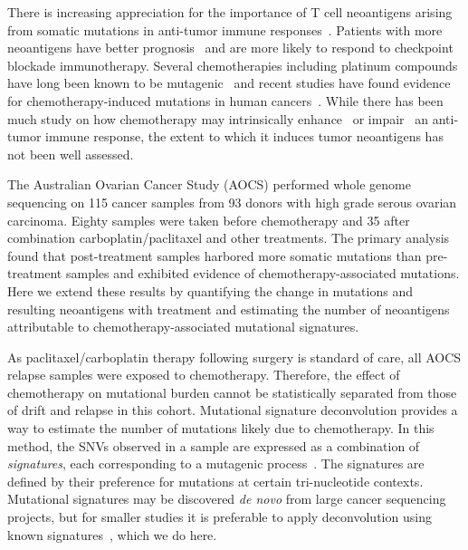 There is increasing appreciation for the importance of T cell neoantigens arising from somatic mutations in anti-tumor immune responses~\cite{Schumacher_2015}. Patients with more neoantigens have better prognosis~\cite{Brown_2014} and are more likely to respond to checkpoint blockade immunotherapy\cite{Van_Allen_2015,Rizvi_2015}. Several chemotherapies including platinum compounds have long been known to be mutagenic~\cite{Hannan_1989} and recent studies have found evidence for chemotherapy-induced mutations in human cancers~\cite{Murugaesu_2015,Johnson_2013}. While there has been much study on how chemotherapy may intrinsically enhance~\cite{Hato_2012,Machiels2001,Hodge2013} or impair~\cite{Litterman_2013} an anti-tumor immune response, the extent to which it induces tumor neoantigens has not been well assessed.

The Australian Ovarian Cancer Study (AOCS) performed whole genome sequencing on 115 cancer samples from 93 donors with high grade serous ovarian carcinoma\cite{Patch_2015}. Eighty samples were taken before chemotherapy and 35 after combination carboplatin/paclitaxel and other treatments. The primary analysis found that post-treatment samples harbored more somatic mutations than pre-treatment samples and exhibited evidence of chemotherapy-associated mutations. Here we extend these results by quantifying the change in mutations and resulting neoantigens with treatment and estimating the number of neoantigens attributable to chemotherapy-associated mutational signatures.

As paclitaxel/carboplatin therapy following surgery is standard of care, all AOCS relapse samples were exposed to chemotherapy. Therefore, the effect of chemotherapy on mutational burden cannot be statistically separated from those of drift and relapse in this cohort. Mutational signature deconvolution provides a way to estimate the number of mutations likely due to chemotherapy. In this method, the SNVs observed in a sample are expressed as a combination of \textit{signatures}, each corresponding to a mutagenic process~\cite{Alexandrov2013}. The signatures are defined by their preference for mutations at certain tri-nucleotide contexts. Mutational signatures may be discovered \textit{de novo} from large cancer sequencing projects, but for smaller studies it is preferable to apply deconvolution using known signatures~\cite{Rosenthal_2016}, which we do here.

